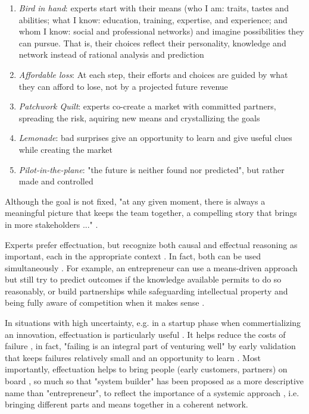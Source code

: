 \documentclass[a4paper,10pt]{article}
\begin{document}
\begin{enumerate}
 \item \emph{Bird in hand}: experts start with their means (who I am: traits, tastes and abilities; 
  what I know: education, training, expertise, and experience; and whom I know: social and professional networks) \cite{effectuationWhatMakesEntrepreneurial} 
  and imagine possibilities they can pursue. 
    That is, their choices reflect their personality, knowledge and network instead of rational analysis and prediction
 \item \emph{Affordable loss}: At each step, their efforts and choices are guided by what they can afford to lose, not by a projected future revenue
 \item \emph{Patchwork Quilt}: experts co-create a market with committed partners, spreading the risk, aquiring new means and crystallizing the goals
 \item \emph{Lemonade}: bad surprises give an opportunity to learn and give useful clues while creating the market
 \item \emph{Pilot-in-the-plane}: "the future is neither found nor predicted", but rather made and controlled 
\end{enumerate}


Although the goal is not fixed, "at any given moment, there is always a meaningful picture that keeps the team together, a compelling story that brings in more
  stakeholders ..." \cite{effectuationWhatMakesEntrepreneurial}.
  
Experts prefer effectuation, but recognize both causal and effectual reasoning as important, each in the appropriate context \cite{effectuationProposal}\cite{effectuationBook}.
In fact, both can be used simultaneously \cite{effectuationVideoEffectuationVsCausation}\cite{effectuationCausationEffectuationAndPragmatism}. 
For example, an entrepreneur can use a 
means-driven approach but still try to predict outcomes if the knowledge available permits to do so reasonably, 
or build partnerships while safeguarding intellectual property and being fully aware of competition when it makes sense \cite{effectuationCausationEffectuationAndPragmatism}.

In situations with high uncertainty, e.g. in a startup phase when commertializing an innovation, effectuation is particularly useful \cite{effectuationProposal}.
It helps reduce the costs of failure \cite{effectuation101}, in fact, "failing is an integral part of venturing well" \cite{effectuationBook} 
by early validation that keeps failures relatively small and an opportunity to learn \cite{effectuationNewVenturePerformance}\cite{effectuationBook}. 
Most importantly, effectuation helps to bring people (early customers, partners) on board \cite{effectuationVideoEffectuationVsCausation}, 
so much so that "system builder" has been proposed as a more descriptive name than
"entrepreneur", to reflect the importance of a systemic approach \cite{effectuationSystemicDesign}, i.e. bringing different parts and means together in a coherent network.
\end{document}
